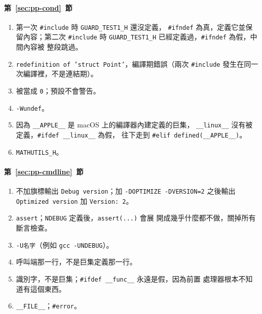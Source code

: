 \paragraph{第~\ref{sec:pp-cond}~節}
\begin{enumerate}
\item 第一次 \texttt{\#include} 時 \texttt{GUARD\_TEST1\_H} 還沒定義，
\texttt{\#ifndef} 為真，定義它並保留內容；第二次 \texttt{\#include} 時
\texttt{GUARD\_TEST1\_H} 已經定義過，\texttt{\#ifndef} 為假，中間內容被
整段跳過。
\item \texttt{redefinition of 'struct Point'}，編譯期錯誤（兩次
\texttt{\#include} 發生在同一次編譯裡，不是連結期）。
\item 被當成 \texttt{0}；預設不會警告。
\item \texttt{-Wundef}。
\item 因為 \texttt{\_\_APPLE\_\_} 是 macOS 上的編譯器內建定義的巨集，
\texttt{\_\_linux\_\_} 沒有被定義，\texttt{\#ifdef \_\_linux\_\_} 為假，
往下走到 \texttt{\#elif defined(\_\_APPLE\_\_)}。
\item \texttt{MATHUTILS\_H}。
\end{enumerate}

\paragraph{第~\ref{sec:pp-cmdline}~節}
\begin{enumerate}
\item 不加旗標輸出 \texttt{Debug version}；加 \texttt{-DOPTIMIZE
-DVERSION=2} 之後輸出 \texttt{Optimized version} 加 \texttt{Version: 2}。
\item \texttt{assert}；\texttt{NDEBUG} 定義後，\texttt{assert(...)} 會展
開成幾乎什麼都不做，關掉所有斷言檢查。
\item \texttt{-U名字}（例如 \texttt{gcc -UNDEBUG}）。
\item 呼叫端那一行，不是巨集定義那一行。
\item 識別字，不是巨集；\texttt{\#ifdef \_\_func\_\_} 永遠是假，因為前置
處理器根本不知道有這個東西。
\item \texttt{\_\_FILE\_\_}；\texttt{\#error}。
\end{enumerate}

